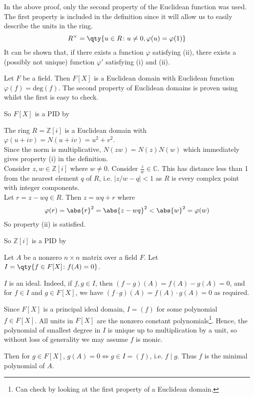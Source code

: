\begin{remark}
	In the above proof, only the second property of the Euclidean function was used.
	The first property is included in the definition since it will allow us to easily describe the units in the ring.
	\begin{align*}
		R^\times = \qty{u \in R \colon u \neq 0, \varphi(u) = \varphi(1)}
	\end{align*}
	It can be shown that, if there exists a function $\varphi$ satisfying (ii), there exists a (possibly not unique) function $\varphi'$ satisfying (i) and (ii).
\end{remark}

\begin{example}
	Let $F$ be a field.
	Then $F[X]$ is a Euclidean domain with Euclidean function $\varphi(f) = \mathrm{deg}(f)$.
	The second property of Euclidean domains is proven using  whilst the first is easy to check.

	So $F[X]$ is a PID by 
\end{example}

\begin{example}
	The ring $R = \mathbb Z[i]$ is a Euclidean domain with $\varphi(u+iv) = N(u+iv) = u^2+v^2$. \\
	Since the norm is multiplicative, $N(zw) = N(z)N(w)$ which immediately gives property (i) in the definition. \\
	Consider $z, w \in \mathbb Z[i]$ where $w \neq 0$.
	Consider $\frac{z}{w} \in \mathbb C$.
	This has distance less than 1 from the nearest element $q$ of $R$, i.e. $|z / w - q| < 1$ as $R$ is every complex point with integer components. \\
	Let $r = z - w q \in R$.
	Then $z = w q + r$ where
	\begin{align*}
		\varphi(r) = \abs{r}^2 = \abs{z - w q}^2 < \abs{w}^2 = \varphi(w)
	\end{align*}
	So property (ii) is satisfied.

	So $\mathbb Z[i]$ is a PID by 
\end{example} 

\begin{example}
	Let $A$ be a nonzero $n \times n$ matrix over a field $F$.
	Let $I = \qty{f \in F[X] \colon f(A) = 0}$.

	$I$ is an ideal.
	Indeed, if $f, g \in I$, then $(f-g)(A) = f(A) - g(A) = 0$, and for $f \in I$ and $g \in F[X]$, we have $(f \cdot g)(A) = f(A) \cdot g(A) = 0$ as required.

	Since $F[X]$ is a principal ideal domain, $I = (f)$ for some polynomial $f \in F[X]$.
	All units in $F[X]$ are the nonzero constant polynomials\footnote{Can check by looking at the first property of a Euclidean domain.}.
	Hence, the polynomial of smallest degree in $I$ is unique up to multiplication by a unit, so without loss of generality we may assume $f$ is monic.

	Then for $g \in F[X]$, $g(A) = 0 \iff g \in I = (f)$, i.e. $f \mid g$.
	Thus $f$ is the minimal polynomial of $A$.
\end{example}

